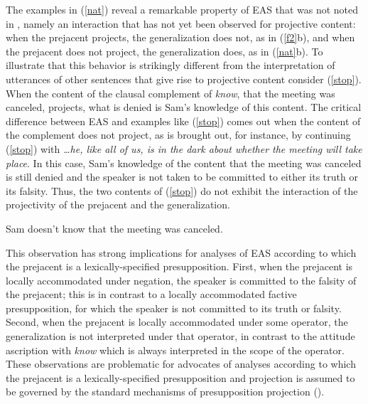 \documentclass[11pt,fleqn]{article}
\newcommand{\6}{\mbox{$[\hspace*{-.6mm}[$}}
\newcommand{\9}{\mbox{$]\hspace*{-.6mm}]$}}
\begin{document}
The examples in (\ref{nat}) reveal a remarkable property of EAS that was not noted in \citealt{karttunen-etal2014}, namely an interaction that has not yet been observed for projective content: when the prejacent projects, the generalization does not, as in (\ref{f2}b), and when the prejacent does not project, the generalization does, as in (\ref{nat}b). To illustrate that this behavior is strikingly different from the interpretation of utterances of other sentences that give rise to projective content consider  (\ref{stop}). When the content of the clausal complement of {\em know}, that the meeting was canceled, projects, what is denied is Sam's knowledge of this content. The critical difference between EAS and examples like (\ref{stop}) comes out when the content of the complement does not project, as is brought out, for instance, by continuing (\ref{stop}) with {\em \ldots he, like all of us, is in the dark about whether the meeting will take place}. In this case, Sam's knowledge of the content that the meeting was canceled is still denied and the speaker is not taken to be committed to either its truth or its falsity. Thus, the two contents of (\ref{stop}) do not exhibit the interaction of the projectivity of the prejacent and the generalization.

\begin{exe}
\ex\label{stop} Sam doesn't know that the meeting was canceled.
\end{exe}
This observation has strong implications for analyses of EAS according to which the prejacent is a lexically-specified presupposition. First, when the prejacent is locally accommodated under negation, the speaker is committed to the falsity of the prejacent; this is in contrast to a locally accommodated factive presupposition, for which the speaker is not committed to its truth or falsity. Second, when the prejacent is locally accommodated under some operator, the generalization is not interpreted under that operator, in contrast to the attitude ascription with {\em know} which is always interpreted in the scope of the operator. These observations are problematic for advocates of analyses according to which the prejacent is a lexically-specified presupposition and projection is assumed to be governed by the standard mechanisms of presupposition projection (\citealt{heim83,vds92}). 
\end{document}
